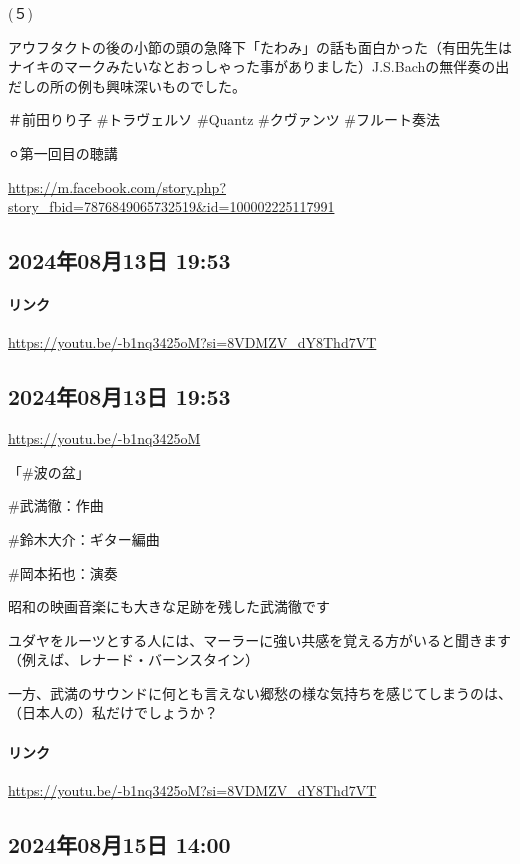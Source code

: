 (５)

アウフタクトの後の小節の頭の急降下「たわみ」の話も面白かった（有田先生はナイキのマークみたいなとおっしゃった事がありました）J.S.Bachの無伴奏の出だしの所の例も興味深いものでした。

＃前田りり子 \#トラヴェルソ \#Quantz \#クヴァンツ \#フルート奏法

⚪︎第一回目の聴講

\url{https://m.facebook.com/story.php?story_fbid=7876849065732519&id=100002225117991}

\subsection*{2024年08月13日 19:53}

\paragraph{リンク}
\url{https://youtu.be/-b1nq3425oM?si=8VDMZV_dY8Thd7VT}

\subsection*{2024年08月13日 19:53}

\url{https://youtu.be/-b1nq3425oM}

「\#波の盆」

\#武満徹：作曲

\#鈴木大介：ギター編曲

\#岡本拓也：演奏

昭和の映画音楽にも大きな足跡を残した武満徹です

ユダヤをルーツとする人には、マーラーに強い共感を覚える方がいると聞きます（例えば、レナード・バーンスタイン）

一方、武満のサウンドに何とも言えない郷愁の様な気持ちを感じてしまうのは、（日本人の）私だけでしょうか？

\paragraph{リンク}
\url{https://youtu.be/-b1nq3425oM?si=8VDMZV_dY8Thd7VT}

\subsection*{2024年08月15日 14:00}

